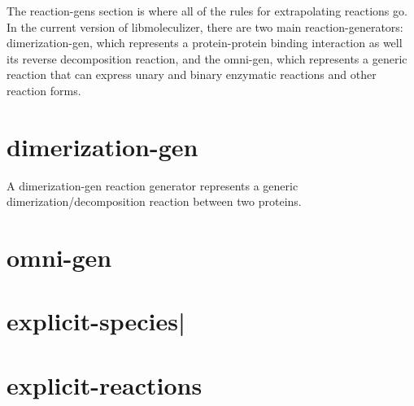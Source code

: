 The reaction-gens section is where all of the rules for extrapolating
reactions go.  In the current version of libmoleculizer, there are two
main reaction-generators: dimerization-gen, which represents a
protein-protein binding interaction as well its reverse decomposition
reaction, and the omni-gen, which represents a generic reaction that
can express unary and binary enzymatic reactions and other reaction
forms.  

\section{dimerization-gen}
A dimerization-gen reaction generator represents a generic
dimerization/decomposition reaction between two proteins.  



\section{omni-gen}

\section{explicit-species|}

\section{explicit-reactions}




